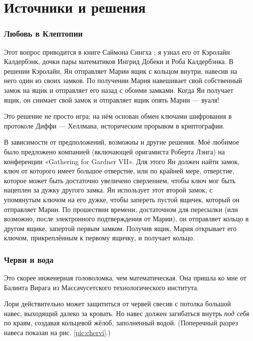 \section*{Источники и решения}

\subsubsection*{Любовь в Клептопии}

Этот вопрос приводится в книге Саймона Сингха \cite{53};
я узнал его от Кэролайн Калдербэнк, дочки пары математиков Ингрид Добеки и Роба Калдербэнка.
В решении Кэролайн, Ян отправляет Марии ящик с кольцом внутри, навесив на него один из своих замков.
По получении Мария навешивает свой собственный замок на ящик и отправляет его назад с обоими замками.
Когда Ян получает ящик, он снимает свой замок и отправляет ящик опять Марии --- вуаля!

Это решение не просто игра;
на нём основан обмен ключами шифрования в протоколе Диффи — Хеллмана, историческим прорывом в криптографии.

В зависимости от предположений, возможны и другие решения.
Моё любимое было предложено компанией (включающей оригамиста Роберта Лэнга) на конференции
«Ga\-the\-ring for Gardner VII».
Для этого Ян должен найти замок, ключ от которого имеет большое отверстие, или по крайней мере, отверстие, которое может быть достаточно увеличено сверлением, чтобы ключ мог быть нацеплен за дужку другого замка.
Ян использует этот второй замок, с упомянутым ключом на его дужке, чтобы запереть пустой ящичек, который он отправляет Марии.
По прошествии времени, достаточном для пересылки (или возможно, после электронного подтверждения от Марии), он отправляет кольцо в другом ящике, запертой первым замком.
Получив ящик, Мария открывает его ключом, прикреплённым к первому ящичку, и получает кольцо.

\subsubsection*{Черви и вода}

Это скорее инженерная головоломка, чем математическая.
Она пришла ко мне от Балинта Вирага из Массачусетского технологического института.

Лори действительно может защититься от червей свесив с потолка большой навес, выходящий далеко за кровать.
Но навес должен загибаться внутрь \emph{под себя} по краям, создавая кольцевой жёлоб, заполненный водой.
(Поперечный разрез навеса показан на рис. \ref{pic:chervi}.)

